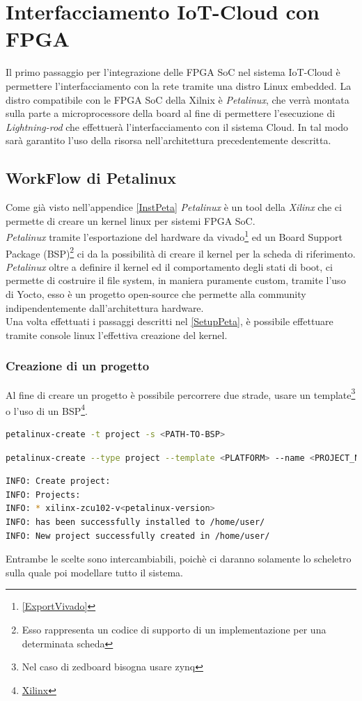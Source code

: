 \chapter{Interfacciamento IoT-Cloud con FPGA}
\label{Linux}
Il primo passaggio per l'integrazione delle FPGA SoC nel sistema IoT-Cloud è permettere l'interfacciamento con la rete tramite una distro Linux embedded. La distro compatibile con le FPGA SoC della Xilnix è \textit{Petalinux}, che verrà montata sulla parte a microprocessore della board al fine di permettere l'esecuzione di \textit{Lightning-rod} che effettuerà l'interfacciamento con il sistema Cloud. In tal modo sarà garantito l'uso della risorsa nell'architettura precedentemente descritta.
\section{WorkFlow di Petalinux}
Come già visto nell'appendice \ref{InstPeta} \textit{Petalinux} è un tool della \textit{Xilinx} che ci permette di creare un kernel linux per sistemi FPGA SoC.\\
\textit{Petalinux} tramite l'esportazione del hardware da vivado\footnote{\ref{ExportVivado}} ed un Board Support Package (BSP)\footnote{Esso rappresenta un codice di supporto di un implementazione per una determinata scheda} ci da la possibilità di creare il kernel per la scheda di riferimento.\\
\textit{Petalinux} oltre a definire il kernel ed il comportamento degli stati di boot, ci permette di costruire il file system, in maniera puramente custom, tramite l'uso di Yocto, esso è un progetto open-source che permette alla community indipendentemente dall'architettura hardware.\\
Una volta effettuati i passaggi descritti nel \ref{SetupPeta}, è possibile effettuare tramite console linux l'effettiva creazione del kernel.
\subsection{Creazione di un progetto}
Al fine di creare un progetto è possibile percorrere due strade, usare un template\footnote{Nel caso di zedboard bisogna usare zynq} o l'uso di un BSP\footnote{\href{https://www.xilinx.com/member/forms/download/xef.html?filename=avnet-digilent-zedboard-v2021.2-final.bsp}{Xilinx}}.
\begin{lstlisting}[language=sh, label=lst:sh, caption={Comando creazione progetto con BSP}]
petalinux-create -t project -s <PATH-TO-BSP>
\end{lstlisting}
\begin{lstlisting}[language=sh, label=lst:sh, caption={Comando creazione progetto con il template}]
petalinux-create --type project --template <PLATFORM> --name <PROJECT_NAME> 
\end{lstlisting}
\begin{lstlisting}[language=sh, label=lst:sh, caption={Output atteso}]
INFO: Create project:
INFO: Projects:
INFO: * xilinx-zcu102-v<petalinux-version>
INFO: has been successfully installed to /home/user/
INFO: New project successfully created in /home/user/
\end{lstlisting}
Entrambe le scelte sono intercambiabili, poichè ci daranno solamente lo scheletro sulla quale poi modellare tutto il sistema.
